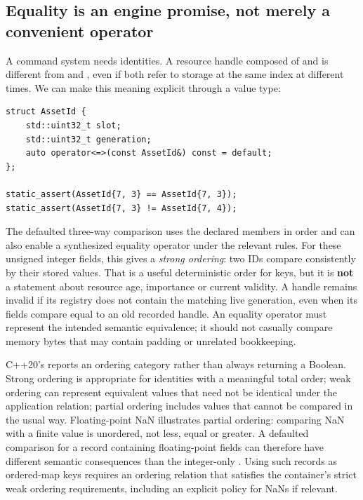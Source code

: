 \subsection{Equality is an engine promise, not merely a convenient operator}\label{01-foundations-i-ch004-equality-is-an-engine-promise-not-merely-a-convenient-operator}

\hypertarget{01-foundations-i-ch004-equality-is-an-engine-promise-not-merely-a-convenient-operator}{}

A command system needs identities. A resource handle composed of  and  is different from  and , even if both refer to storage at the same index at different times. We can make this meaning explicit through a value type:

\begin{verbatim}
struct AssetId {
    std::uint32_t slot;
    std::uint32_t generation;
    auto operator<=>(const AssetId&) const = default;
};

static_assert(AssetId{7, 3} == AssetId{7, 3});
static_assert(AssetId{7, 3} != AssetId{7, 4});
\end{verbatim}

The defaulted three-way comparison uses the declared members in order and can also enable a synthesized equality operator under the relevant rules. For these unsigned integer fields, this gives a \emph{strong ordering}: two IDs compare consistently by their stored values. That is a useful deterministic order for keys, but it is \textbf{not} a statement about resource age, importance or current validity. A handle remains invalid if its registry does not contain the matching live generation, even when its fields compare equal to an old recorded handle. An equality operator must represent the intended semantic equivalence; it should not casually compare memory bytes that may contain padding or unrelated bookkeeping.

C++20's \BookInlineCode{{\textless{}}{=}{\textgreater{}}}{\textless{}=\textgreater{}} reports an ordering category rather than always returning a Boolean. Strong ordering is appropriate for identities with a meaningful total order; weak ordering can represent equivalent values that need not be identical under the application relation; partial ordering includes values that cannot be compared in the usual way. Floating-point NaN illustrates partial ordering: comparing NaN with a finite value is unordered, not less, equal or greater. A defaulted comparison for a record containing floating-point fields can therefore have different semantic consequences than the integer-only . Using such records as ordered-map keys requires an ordering relation that satisfies the container's strict weak ordering requirements, including an explicit policy for NaNs if relevant.

